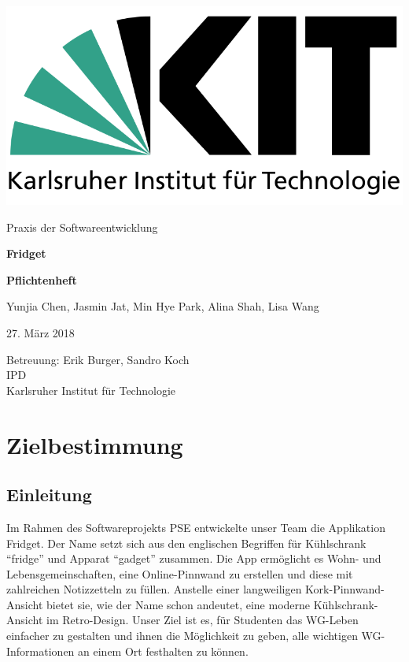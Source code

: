 \documentclass[a4paper]{scrreprt}
\begin{document}
    \begin{flushright}
        \includegraphics[scale = 0.2]{kit-logo.png}\\[0.5cm]
    \end{flushright}
    \vspace*{2cm}

    \begin{center} 
    		\large Praxis der Softwareentwicklung
        \vspace*{1.5cm}

        \textbf{\huge Fridget}
        \vspace*{1cm}

        \textbf{\Large Pflichtenheft}
        \vspace*{2cm}

        Yunjia Chen, Jasmin Jat, Min Hye Park, Alina Shah, Lisa Wang
        \vspace*{1cm}

        27. März 2018
        \vspace*{2.5cm}

        Betreuung: Erik Burger, Sandro Koch\\[0.5cm]
        IPD\\[0.5cm]

        Karlsruher Institut für Technologie
    \end{center}
    \thispagestyle{empty}

    \tableofcontents

    \chapter{Zielbestimmung}
    
    	\section{Einleitung}
    	Im Rahmen des Softwareprojekts PSE entwickelte unser Team die Applikation Fridget. Der Name setzt sich aus den englischen Begriffen für Kühlschrank ``fridge” und Apparat ``gadget” zusammen. Die App ermöglicht es Wohn- und Lebensgemeinschaften, eine Online-Pinnwand zu erstellen und diese mit zahlreichen Notizzetteln zu füllen. Anstelle einer langweiligen Kork-Pinnwand-Ansicht bietet sie, wie der Name schon andeutet, eine moderne Kühlschrank-Ansicht im Retro-Design.
    	Unser Ziel ist es, für Studenten das WG-Leben einfacher zu gestalten und ihnen die Möglichkeit zu geben, alle wichtigen WG-Informationen an einem Ort festhalten zu können.
    	
\end{document}
